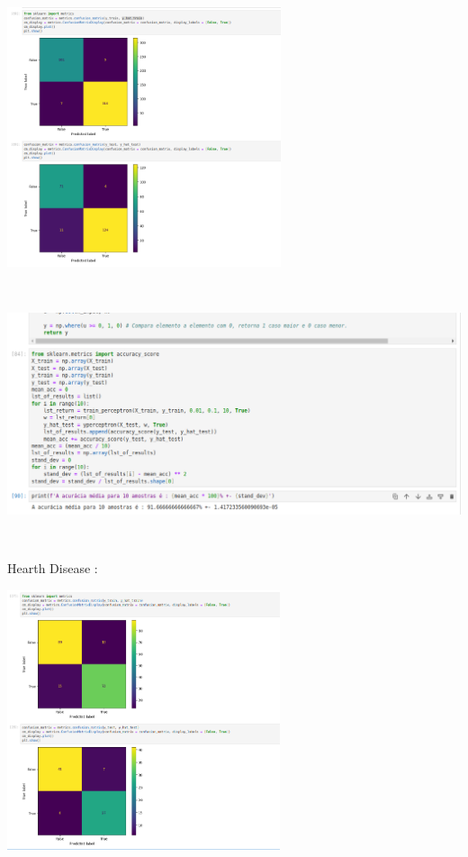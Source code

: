 \documentclass{article}
\begin{document}
\begin{center}
\begin{center}

\includegraphics[height=3in]{Ex6/perceptron/conf_matrix_Breast.png}
\vspace{10pt}

\end{center}

\begin{center}
    
\includegraphics[height=3in]{Ex6/perceptron/acc_Breast_Cancer.png}
\vspace{10pt}

\end{center}

\vspace{10pt}

Hearth Disease : 

\begin{center}

\includegraphics[height=3in]{Ex6/perceptron/conf_matrix_hearth.png}
\vspace{10pt}


\end{center}
\end{center}
\end{document}
